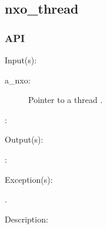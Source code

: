 %
%
%
%
%              

\subsection{nxo\_thread}
\label{nxo_thread}

\subsubsection{API}
\begin{capi}
\label{nxo_thread_}
	\begin{capilist}
	\item[Input(s): ]
		\begin{description}\item[]
		\item[a\_nxo: ]
			Pointer to a thread .
		\item[: ]
		\end{description}
	\item[Output(s): ]
		\begin{description}\item[]
		\item[: ]
		\end{description}
	\item[Exception(s): ]
		\begin{description}\item[]
		\item[.]
		\end{description}
	\item[Description: ]
	\end{capilist}
\end{capi}
